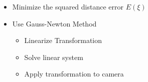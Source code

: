 \documentclass{beamer}
\begin{document}
{\begin{columns}
\begin{itemize}
                            \item Minimize the squared distance error $E(\xi)$
                            \item Use Gauss-Newton Method
                            \begin{itemize}
                                  \item Linearize Transformation
                                  \item Solve linear system
                                  \item Apply transformation to camera 
                            \end{itemize}
                \end{itemize}
        \end{columns}
}
\end{document}
